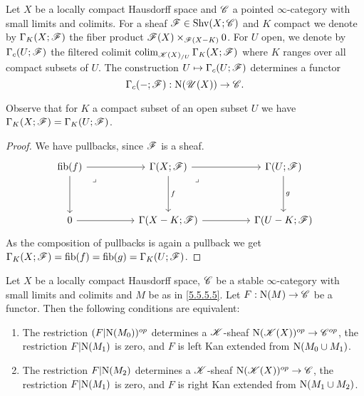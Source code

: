 \documentclass[../../thesis.tex]{subfiles}
\begin{document}
\begin{definition}[{\cite[Definition 5.5.5.9]{HA}}]
    Let $X$ be a locally compact Hausdorff space and $\mathscr{C}$ a pointed $\infty$-category with small limits and colimits.
    For a sheaf $\mathscr{F} \in \mathrm{Shv}(X;\mathscr{C})$ and $K$ compact we denote by $\Gamma_K(X;\mathscr{F})$ the fiber product $\mathscr{F}(X)\times_{\mathscr{F}(X-K)}0$.
    For $U$ open, we denote by $\Gamma_c(U;\mathscr{F})$ the filtered colimit $\operatorname{colim}_{\mathscr{K}(X)_{/U}}\Gamma_K(X;\mathscr{F})$ where $K$ ranges over all compact subsets of $U$.
    The construction $U \mapsto \Gamma_c(U;\mathscr{F})$ determines a functor
    \[
        \Gamma_c({-} ;\mathscr{F}) : \mathrm{N}(\mathscr{U}(X)) \to \mathscr{C} .
    \]
\end{definition}
\begin{remark}\label{GammaKXisGammaKU}
    Observe that for $K$ a compact subset of an open subset $U$ we have $\Gamma_K(X;\mathscr{F}) = \Gamma_K(U;\mathscr{F})$.
\end{remark}
\begin{proof}
    We have pullbacks, since $\mathscr{F}$ is a sheaf.
    \[\begin{tikzcd}
            {\fib(f)} && {\Gamma(X;\F)} && {\Gamma(U;\F)} \\
            \\
            0 && {\Gamma(X-K;\F)} && {\Gamma(U-K;\F)}
            \arrow[from=1-3, to=1-5]
            \arrow["f", from=1-3, to=3-3]
            \arrow[from=3-3, to=3-5]
            \arrow["g", from=1-5, to=3-5]
            \arrow["\lrcorner"{anchor=center, pos=0.125}, draw=none, from=1-3, to=3-5]
            \arrow[from=1-1, to=3-1]
            \arrow[from=3-1, to=3-3]
            \arrow[from=1-1, to=1-3]
            \arrow["\lrcorner"{anchor=center, pos=0.125}, draw=none, from=1-1, to=3-3]
        \end{tikzcd}\]
    As the composition of pullbacks is again a pullback we get $\Gamma_K(X;\mathscr{F})=\operatorname{fib}(f)=\operatorname{fib}(g)=\Gamma_K(U;\mathscr{F})$.
\end{proof}
\begin{lemma}[{\cite[Proposition 5.5.5.7]{HA}}]\label{5.5.5.7}
    Let $X$ be a locally compact Hausdorff space, $\mathscr{C}$ be a stable $\infty$-category with small limits and colimits and $M$ be as in \ref{5.5.5.5}.
    Let $F : \mathrm{N}(M) \to \mathscr{C}$ be a functor.
    Then the following conditions are equivalent:
    \begin{enumerate}
        \item The restriction $(F|\mathrm{N}(M_0))^{op}$ determines a $\mathscr{K}$-sheaf $\mathrm{N}(\mathscr{K}(X))^{op} \to \mathscr{C}^{op}$, the restriction $F|\mathrm{N}(M_1)$ is zero, and $F$ is left Kan extended from $\mathrm{N}(M_0 \cup M_1)$.
        \item The restriction $F|\mathrm{N}(M_2)$ determines a $\mathscr{K}$-sheaf $\mathrm{N}(\mathscr{K}(X))^{op} \to \mathscr{C}$, the restriction $F|\mathrm{N}(M_1)$ is zero, and $F$ is right Kan extended from $\mathrm{N}(M_1 \cup M_2)$.
    \end{enumerate}
\end{lemma}
\end{document}
